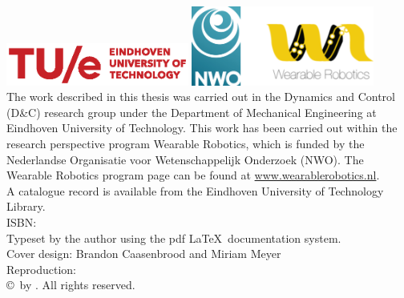 \thispagestyle{empty}
\vspace*{30mm}\noindent
\begin{center}
{\LARGE\sf\maintitle}\\[4.5cm] %
{\Large\sf \@author}
\end{center}

\newpage
\thispagestyle{empty}

\vspace*{\fill}

\hspace*{-7mm}\includegraphics[width=6cm]{./img/TUeLOG_new.eps} \hspace*{1mm}\includegraphics[width=6cm]{./img/NWO_WR.png}\\[2mm]
{\small The work described in this thesis was carried out in the Dynamics and Control (D\&C) research group under the Department of Mechanical Engineering at Eindhoven University of Technology. This work has been carried out within the research perspective program Wearable Robotics, which is funded by the Nederlandse Organisatie voor Wetenschappelijk Onderzoek (NWO). The Wearable Robotics program page can be found at \url{www.wearablerobotics.nl}.} \\[.5mm]

\noindent\bgroup\small
A catalogue record is available from the Eindhoven University of Technology Library.\\
ISBN: \isbn
\\[4mm]
Typeset by the author using the pdf \LaTeX \ documentation system.\\
Cover design: Brandon Caasenbrood and Miriam Meyer \\
Reproduction: \printer\\[8mm]
\copyright\year\, by \@author. All rights reserved.
\egroup

